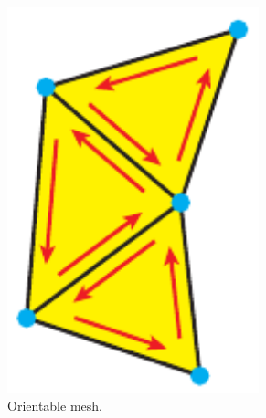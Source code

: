 \begin{description}
	\begin{figure}[H]
		\centering
		\begin{subfigure}[b]{0.3\textwidth}
			\centering
			\includegraphics[width=0.8\textwidth]{images/orientable}
			\caption{Orientable mesh.}
			\label{fig:orientable}
		\end{subfigure}
		\begin{subfigure}[b]{0.3\textwidth}
			\centering

\end{subfigure}
\end{figure}
\end{description}

